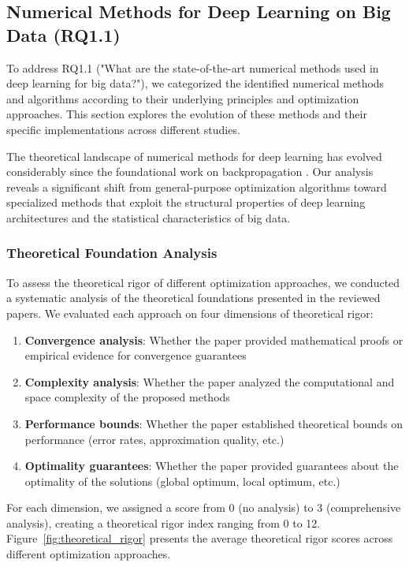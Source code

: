 \subsection{Numerical Methods for Deep Learning on Big Data (RQ1.1)}
To address RQ1.1 ("What are the state-of-the-art numerical methods used in deep learning for big data?"), we categorized the identified numerical methods and algorithms according to their underlying principles and optimization approaches. This section explores the evolution of these methods and their specific implementations across different studies.

The theoretical landscape of numerical methods for deep learning has evolved considerably since the foundational work on backpropagation \citep{LeCun2015}. Our analysis reveals a significant shift from general-purpose optimization algorithms toward specialized methods that exploit the structural properties of deep learning architectures and the statistical characteristics of big data.

\subsubsection{Theoretical Foundation Analysis}
To assess the theoretical rigor of different optimization approaches, we conducted a systematic analysis of the theoretical foundations presented in the reviewed papers. We evaluated each approach on four dimensions of theoretical rigor:

\begin{enumerate}
    \item \textbf{Convergence analysis}: Whether the paper provided mathematical proofs or empirical evidence for convergence guarantees
    \item \textbf{Complexity analysis}: Whether the paper analyzed the computational and space complexity of the proposed methods
    \item \textbf{Performance bounds}: Whether the paper established theoretical bounds on performance (error rates, approximation quality, etc.)
    \item \textbf{Optimality guarantees}: Whether the paper provided guarantees about the optimality of the solutions (global optimum, local optimum, etc.)
\end{enumerate}

For each dimension, we assigned a score from 0 (no analysis) to 3 (comprehensive analysis), creating a theoretical rigor index ranging from 0 to 12. Figure~\ref{fig:theoretical_rigor} presents the average theoretical rigor scores across different optimization approaches.

